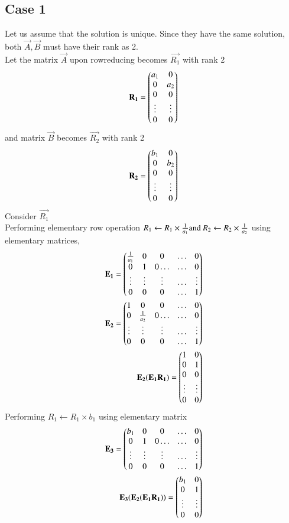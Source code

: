 \documentclass[journal,12pt,twocolumn]{IEEEtran}
\begin{document}
\subsection{Case 1}
Let us assume that the solution is unique.
Since they have the same solution, both $\vec{A},\vec{B}$ must have their rank as 2.\\
Let the matrix $\vec{A}$ upon rowreducing becomes $\vec{R_1}$ with rank 2
\begin{align}
   \mathbf{R_1}= \begin{pmatrix}a_1&0\\0&a_2\\0&0\\ \vdots & \vdots \\0&0\end{pmatrix} 
\end{align}
and  matrix $\vec{B}$ becomes $\vec{R_2}$ with rank 2
\begin{align}
   \mathbf{R_2}= \begin{pmatrix}b_1&0\\0&b_2\\0&0\\ \vdots & \vdots \\0&0\end{pmatrix} 
\end{align}
Consider $\vec{R_1}$\\
Performing elementary row operation $R_1\leftarrow R_1 \times \frac{1}{a_1}\\ \text{and } R_2\leftarrow R_2 \times \frac{1}{a_2}$ using elementary matrices,
\begin{align}
    \mathbf{E_1}=\begin{pmatrix}\frac{1}{a_1}&0&0&\hdots&0\\0&1&0\hdots&\hdots&0\\\vdots&\vdots&\vdots&\hdots&\vdots\\0&0&0&\hdots&1\end{pmatrix}\\
    \mathbf{E_2}=\begin{pmatrix}1&0&0&\hdots&0\\0&\frac{1}{a_2}&0\hdots&\hdots&0\\\vdots&\vdots&\vdots&\hdots&\vdots\\0&0&0&\hdots&1\end{pmatrix}\\
    \mathbf{E_2}(\mathbf{E_1}\mathbf{R_1})=\begin{pmatrix}1&0\\0&1\\0&0\\ \vdots & \vdots \\0&0\end{pmatrix}
\end{align}
Performing  $R_1\leftarrow R_1 \times b_1$ using elementary matrix
\begin{align}
\mathbf{E_3}=\begin{pmatrix}b_1&0&0&\hdots&0\\0&1&0\hdots&\hdots&0\\\vdots&\vdots&\vdots&\hdots&\vdots\\0&0&0&\hdots&1\end{pmatrix}\\
\mathbf{E_3}(\mathbf{E_2}(\mathbf{E_1}\mathbf{R_1}))=\begin{pmatrix}b_1&0\\0&1\\\vdots&\vdots\\0&0\end{pmatrix}
\end{align}
\end{document}
